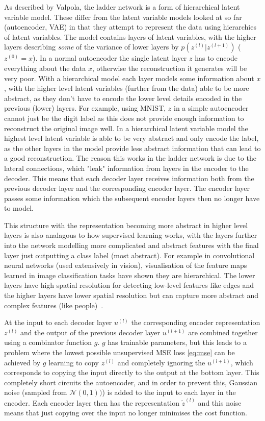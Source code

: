 \documentclass[12pt,a4paper,twoside,openright]{report}
\begin{document}
As described by Valpola, the ladder network is a form of hierarchical latent variable model. These differ from the latent variable models
looked at so far (autoencoder, VAE) in that they attempt to represent the data using hierarchies of latent variables. The model contains
layers of latent variables, with the higher layers describing \textit{some} of the variance of lower layers by $p(z^{(l)}|z^{(l+1)})$ ($z^{(0)} = x$). 
In a normal autoencoder the single latent layer $z$ has to encode everything about the data $x$, otherwise the reconstruction it generates 
will be very poor. With a hierarchical model each layer models some information about $x$, with the higher level latent variables 
(further from the data) able to be more abstract, as they don't have to encode the lower level details encoded in the previous (lower) layers. For example, using MNIST, $z$ in a simple
autoencoder cannot just be the digit label as this does not provide enough information to reconstruct the original image well. In a hierarchical latent variable model the highest
level latent variable is able to be very abstract and only encode the label, as the other layers in the model provide less abstract information that can lead to a good reconstruction.
The reason this works in the ladder network is due to the lateral connections, which "leak" information from layers in the encoder to the decoder. This means that each decoder layer
receives information both from the previous decoder layer and the corresponding encoder layer. The encoder layer passes some information which
the subsequent encoder layers then no longer have to model.

This structure with the representation becoming more abstract in higher level layers is also analagous to how supervised learning works, with the layers 
further into the network modelling more complicated and abstract features with the final layer just outputting a class label (most abstract). For example in convolutional
neural networks (used extensively in vision), visualisation of the feature maps learned in image classification tasks have shown they are hierarchical. The lower layers
have high spatial resolution for detecting low-level features like edges and the higher layers have lower spatial resolution but can capture more abstract and complex features
(like people)~\cite{conv_hierarch}.

At the input to each decoder layer $u^{(l)}$ the corresponding encoder representation $z^{(l)}$ and the output of the previous decoder layer $u^{(l+1)}$ are combined together
using a combinator function $g$. $g$ has trainable parameters, but this leads to a problem where the lowest possible unsupervised MSE loss \eqref{eq:mse} can be 
achieved by $g$ learning to copy $z^{(l)}$ and completely ignoring the $u^{(l+1)}$, which corresponds to copying the input directly to the output at the bottom layer.
This completely short circuits the autoencoder, and in order to prevent this, Gaussian noise (sampled from $\mathcal{N}(0, 1))$) is added to the input to each layer 
in the encoder. Each encoder layer then has the representation $\tilde{z}^{(l)}$ and this noise means that just copying over the input no longer minimises the cost function. 
\end{document}
